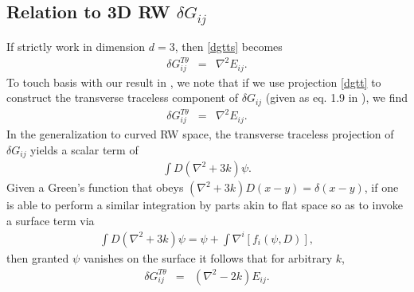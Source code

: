 \documentclass[10pt,letterpaper]{article}
\numberwithin{equation}{section}
\begin{document}
\subsection{Relation to 3D RW $\delta G_{ij}$}
If strictly work in dimension $d=3$, then \eqref{dgtts} becomes
\begin{eqnarray}
\delta G_{ij}^{T\theta} &=& \nabla^2 E_{ij}.
\end{eqnarray}
To touch basis with our result in \cite{3space}, we note that if we use projection \eqref{dgtt} to construct the transverse traceless component of $\delta G_{ij}$ (given as eq. 1.9 in \cite{3space}), we find
\begin{eqnarray}
\delta G_{ij}^{T\theta} &=& \nabla^2 E_{ij}.
\end{eqnarray}
In the generalization to curved RW space, the transverse traceless projection of $\delta G_{ij}$ yields a scalar term of
\begin{eqnarray}
\int D (\nabla^2+3k)\psi.
\end{eqnarray}
Given a Green's function that obeys $(\nabla^2+3k)D(x-y) = \delta(x-y)$, if one is able to perform a similar integration by parts akin to flat space so as to invoke a surface term via
\begin{eqnarray}
\int D(\nabla^2+3k)\psi = \psi+\int \nabla^i[f_i(\psi,D)],
\end{eqnarray}
then granted $\psi$ vanishes on the surface it follows that for arbitrary $k$, 
\begin{eqnarray}
\delta G_{ij}^{T\theta} &=& (\nabla^2-2k)E_{ij}.
\end{eqnarray}

%      
%
\end{document}
